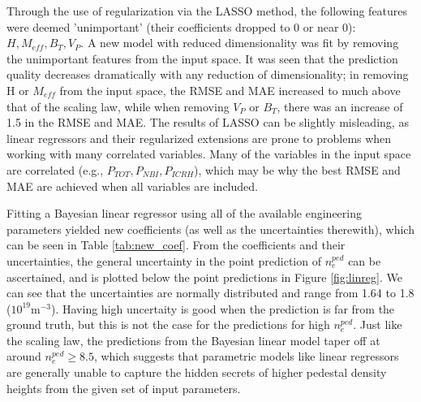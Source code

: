 \documentclass[a4paper, twoside, final, 12pt]{article}
\begin{document}
{Through the use of regularization via the LASSO method, the following features were deemed 'unimportant' (their coefficients dropped to 0 or near 0): $H, M_{eff}, B_T, V_P$.
A new model with reduced dimensionality was fit by removing the unimportant features from the input space.
It was seen that the prediction quality decreases dramatically with any reduction of dimensionality; in removing H or $M_{eff}$ from the input space, the RMSE and MAE increased to much above that of the scaling law, while when removing $V_P$ or $B_T$, there was an increase of 1.5 in the RMSE and MAE. 
The results of LASSO can be slightly misleading, as linear regressors and their regularized extensions are prone to problems when working with many correlated variables. Many of the variables in the input space are correlated (e.g., $P_{TOT}, P_{NBI}, P_{ICRH}$), which may be why the best RMSE and MAE are achieved when all variables are included.

Fitting a Bayesian linear regressor using all of the available engineering parameters yielded new coefficients (as well as the uncertainties therewith), which can be seen in Table \ref{tab:new_coef}. 
From the coefficients and their uncertainties, the general uncertainty in the point prediction of $n_e^{ped}$ can be ascertained, and is plotted below the point predictions in Figure \ref{fig:linreg}.
We can see that the uncertainties are normally distributed and range from 1.64 to 1.8 ($10^{19}\text{m}^{-3}$). Having high uncertaity is good when the prediction is far from the ground truth, but this is not the case for the predictions for high $n_e^{ped}$. 
Just like the scaling law, the predictions from the Bayesian linear model taper off at around $n_e^{ped} \geq 8.5$, which suggests that parametric models like linear regressors are generally unable to capture the hidden secrets of higher pedestal density heights from the given set of input parameters.

}
\end{document}
